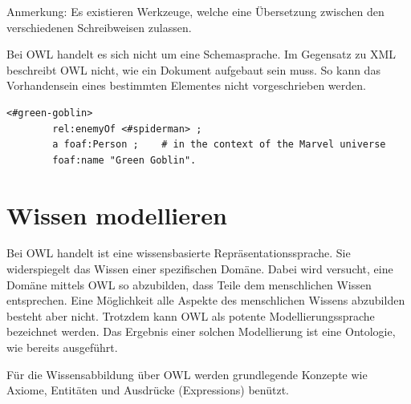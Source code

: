 Anmerkung: Es existieren Werkzeuge, welche eine Übersetzung zwischen den verschiedenen Schreibweisen zulassen.

Bei OWL handelt es sich nicht um eine Schemasprache. Im Gegensatz zu XML beschreibt OWL nicht, wie ein Dokument aufgebaut sein muss. So kann das Vorhandensein eines bestimmten Elementes nicht vorgeschrieben werden.

\begin{lstlisting}[caption={Beispiel der Turtle Syntax\protect\footnotemark}]
    <#green-goblin>
        rel:enemyOf <#spiderman> ;
        a foaf:Person ;    # in the context of the Marvel universe
        foaf:name "Green Goblin".
\end{lstlisting}

\section{Wissen modellieren}
\label{sec:owl_owl_wissenModellieren}
Bei OWL handelt ist eine wissensbasierte Repräsentationssprache. Sie widerspiegelt das Wissen einer spezifischen Domäne. Dabei wird versucht, eine Domäne mittels OWL so abzubilden, dass Teile dem menschlichen Wissen entsprechen. Eine Möglichkeit alle Aspekte des menschlichen Wissens abzubilden besteht aber nicht. Trotzdem kann OWL als potente Modellierungssprache bezeichnet werden. Das Ergebnis einer solchen Modellierung ist eine Ontologie, wie bereits ausgeführt.

Für die Wissensabbildung über OWL werden grundlegende Konzepte wie Axiome, Entitäten und Ausdrücke (Expressions) benützt.


